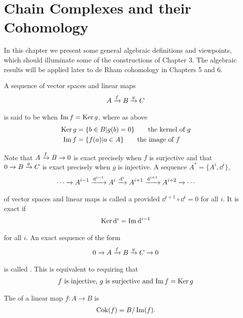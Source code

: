 \chapter{Chain Complexes and their Cohomology}
In this chapter we present some general algebraic definitions and viewpoints,
which should illuminate some of the constructions of Chapter 3. The algebraic
results will be applied later to de Rham cohomology in Chapters 5 and 6.

A sequence of vector spaces and linear maps
\begin{align}\label{eq:4-1}
  A \xrightarrow[]{f} B \xrightarrow[]{g} C
\end{align}

is said to be  when $\operatorname{Im} f = \operatorname{Ker} g$, where as above
\begin{align*}
  \operatorname{Ker} g & = \{b\in B | g(b) = 0\}\qquad \text{the kernel of } g \\
  \operatorname{Im} f  & = \{f(a) | a\in A\}\qquad \text{the image of } f
\end{align*}

Note that $A\xrightarrow[]{f}B\xrightarrow[]{}0$ is exact precisely when $f$ is surjective and that $0\xrightarrow[]{}B\xrightarrow[]{g}C$ is exact
precisely when $g$ is injective. A sequence $A^* = \{A^i, \dd^i\}$,
\begin{align}\label{eq:4-2}
  \cdots \xrightarrow[]{} A^{i-1}\xrightarrow[]{\mathrm{d}^{i-1}} A^i \xrightarrow[]{\mathrm{d}^i} A^{i+1} \xrightarrow[]{\mathrm{d}^{i+1}} A^{i+2}\xrightarrow[]{}\cdots
\end{align}

of vector spaces and linear maps is called a  provided $\dd^{i+1}\circ\dd^i = 0$
for all $i$. It is exact if
\begin{align*}
  \operatorname{Ker} \mathrm{d}^i = \operatorname{Im} \mathrm{d}^{i-1}
\end{align*}

for all $i$. An exact sequence of the form
\begin{align}\label{eq:4-3}
  0\xrightarrow[]{}A\xrightarrow[]{f}B\xrightarrow[]{g}C\xrightarrow[]{}0
\end{align}

is called . This is equivalent to requiring that
\begin{align*}
  \text{$f$ is injective, $g$ is surjective and $\operatorname{Im} f = \operatorname{Ker} g$}
\end{align*}

The  of a linear map $f:A\to B$ is
\begin{align*}
  \operatorname{Cok}(f) = B/\operatorname{Im}(f).
\end{align*}

